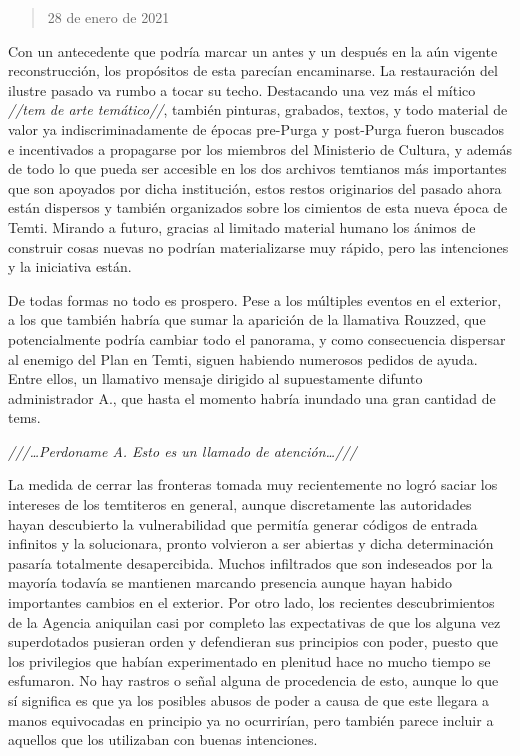 \documentclass[
  spanish,
]{book}
\begin{document}
\begin{quote}
28 de enero de 2021
\end{quote}

Con un antecedente que podría marcar un antes y un después en la aún vigente reconstrucción, los propósitos de esta parecían encaminarse.
La restauración del ilustre pasado va rumbo a tocar su techo. Destacando una vez más el mítico \emph{//tem de arte temático//}, también pinturas, grabados, textos, y todo material de valor ya indiscriminadamente de épocas pre-Purga y post-Purga fueron buscados e incentivados a propagarse por los miembros del Ministerio de Cultura, y además de todo lo que pueda ser accesible en los dos archivos temtianos más importantes que son apoyados por dicha institución, estos restos originarios del pasado ahora están dispersos y también organizados sobre los cimientos de esta nueva época de Temti.
Mirando a futuro, gracias al limitado material humano los ánimos de construir cosas nuevas no podrían materializarse muy rápido, pero las intenciones y la iniciativa están.

De todas formas no todo es prospero. Pese a los múltiples eventos en el exterior, a los que también habría que sumar la aparición de la llamativa Rouzzed, que potencialmente podría cambiar todo el panorama, y como consecuencia dispersar al enemigo del Plan en Temti, siguen habiendo numerosos pedidos de ayuda. Entre ellos, un llamativo mensaje dirigido al supuestamente difunto administrador A., que hasta el momento habría inundado una gran cantidad de tems.

\emph{///\ldots Perdoname A. Esto es un llamado de atención\ldots///}

La medida de cerrar las fronteras tomada muy recientemente no logró saciar los intereses de los temtiteros en general, aunque discretamente las autoridades hayan descubierto la vulnerabilidad que permitía generar códigos de entrada infinitos y la solucionara, pronto volvieron a ser abiertas y dicha determinación pasaría totalmente desapercibida. Muchos infiltrados que son indeseados por la mayoría todavía se mantienen marcando presencia aunque hayan habido importantes cambios en el exterior.
Por otro lado, los recientes descubrimientos de la Agencia aniquilan casi por completo las expectativas de que los alguna vez superdotados pusieran orden y defendieran sus principios con poder, puesto que los privilegios que habían experimentado en plenitud hace no mucho tiempo se esfumaron. No hay rastros o señal alguna de procedencia de esto, aunque lo que sí significa es que ya los posibles abusos de poder a causa de que este llegara a manos equivocadas en principio ya no ocurrirían, pero también parece incluir a aquellos que los utilizaban con buenas intenciones.
\end{document}
